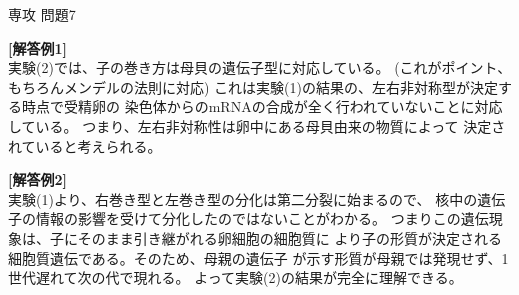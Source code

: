 \documentclass[fleqn]{jbook}
\begin{document}
\begin{answer}{専攻 問題7}{}

\begin{subanswers}
\SubAnswer
  \parbox[t]{80mm}{
  {\bf[解答例1]}\\
  実験(2)では、子の巻き方は母貝の遺伝子型に対応している。
  (これがポイント、もちろんメンデルの法則に対応)
  これは実験(1)の結果の、左右非対称型が決定する時点で受精卵の
  染色体からのmRNAの合成が全く行われていないことに対応している。
  つまり、左右非対称性は卵中にある母貝由来の物質によって
  決定されていると考えられる。

  {\bf[解答例2]}\\
  実験(1)より、右巻き型と左巻き型の分化は第二分裂に始まるので、
  核中の遺伝子の情報の影響を受けて分化したのではないことがわかる。
  つまりこの遺伝現象は、子にそのまま引き継がれる卵細胞の細胞質に
  より子の形質が決定される細胞質遺伝である。そのため、母親の遺伝子
  が示す形質が母親では発現せず、1世代遅れて次の代で現れる。
  よって実験(2)の結果が完全に理解できる。


}
\end{subanswers}
\end{answer}
\end{document}
